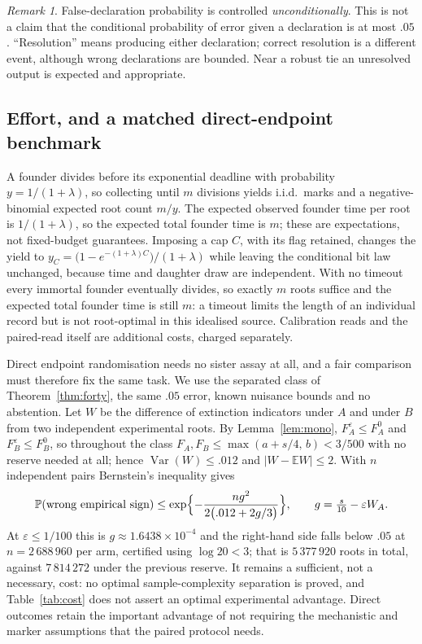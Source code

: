 \documentclass[11pt]{article}
\theoremstyle{plain}
\theoremstyle{definition}
\theoremstyle{remark}
\newtheorem{remark}[theorem]{Remark}
\newcommand{\E}{\mathbb E}
\newcommand{\Prob}{\mathbb P}
\newcommand{\eps}{\varepsilon}
\newcommand{\Var}{\operatorname{Var}}
\begin{document}
\begin{remark}
False-declaration probability is controlled \emph{unconditionally}. This is not
a claim that the conditional probability of error given a declaration is at
most $.05$. ``Resolution'' means producing either declaration; correct
resolution is a different event, although wrong declarations are bounded. Near
a robust tie an unresolved output is expected and appropriate.
\end{remark}

\subsection{Effort, and a matched direct-endpoint benchmark}

A founder divides before its exponential deadline with probability
$y=1/(1+\lambda)$, so collecting until $m$ divisions yields i.i.d.\ marks and a
negative-binomial expected root count $m/y$. The expected observed founder time
per root is $1/(1+\lambda)$, so the expected total founder time is $m$; these
are expectations, not fixed-budget guarantees. Imposing a cap $C$, with its
flag retained, changes the yield to $y_C=\bigl(1-e^{-(1+\lambda)C}\bigr)/(1+\lambda)$
while leaving the conditional bit law unchanged, because time and daughter draw
are independent. With no timeout every immortal founder eventually divides, so
exactly $m$ roots suffice and the expected total founder time is still $m$: a
timeout limits the length of an individual record but is not root-optimal in
this idealised source. Calibration reads and the paired-read itself are
additional costs, charged separately.

Direct endpoint randomisation needs no sister assay at all, and a fair
comparison must therefore fix the same task. We use the separated class of
Theorem~\ref{thm:forty}, the same $.05$ error, known nuisance bounds and no
abstention. Let $W$ be the difference of extinction indicators under $A$ and
under $B$ from two independent experimental roots. By Lemma~\ref{lem:mono},
$F_A^{\eps}\le F_A^0$ and $F_B^{\eps}\le F_B^0$, so throughout the class
$F_A,F_B\le\max(a+s/4,\,b)<3/500$ with no reserve needed at all; hence
$\Var(W)\le.012$ and $|W-\E W|\le2$. With $n$ independent pairs Bernstein's
inequality \citep[\S2.8]{BoucheronLugosiMassart2013} gives
\begin{equation}\label{eq:bernstein}
 \Prob(\text{wrong empirical sign})
 \le\exp\Bigl\{-\frac{ng^2}{2\bigl(.012+2g/3\bigr)}\Bigr\},
 \qquad g=\tfrac{s}{10}-\eps W_A .
\end{equation}
At $\eps\le1/100$ this is $g\approx1.6438\times10^{-4}$ and the right-hand side
falls below $.05$ at $n=2\,688\,960$ per arm, certified using $\log20<3$; that
is $5\,377\,920$ roots in total, against $7\,814\,272$ under the previous
reserve. It remains a sufficient, not a necessary, cost: no optimal
sample-complexity separation is proved, and Table~\ref{tab:cost} does not
assert an optimal experimental advantage. Direct outcomes retain the important
advantage of not requiring the mechanistic and marker assumptions that the
paired protocol needs.
\end{document}

